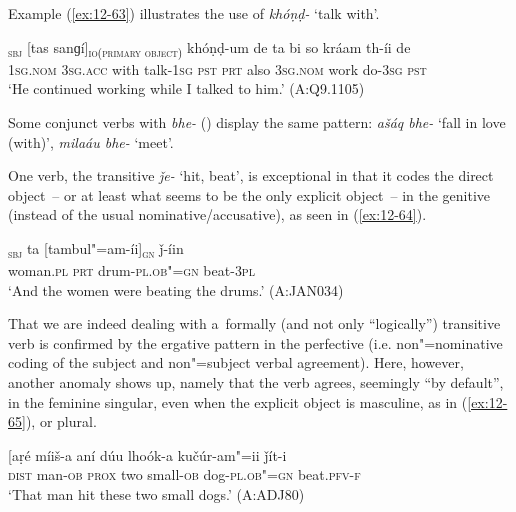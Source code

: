 Example (\ref{ex:12-63}) illustrates the use of \textit{khóṇḍ-} `talk with'.

\begin{exe}
\ex
\label{ex:12-63}
\gll [ma]\textsubscript{\textsc{sbj}} [tas sanɡí]\textsubscript{\textsc{io(primary object)}} khóṇḍ-um de ta bi so kráam th-íi de \\
\textsc{1sg.nom} \textsc{3sg.acc} with talk-\textsc{1sg} \textsc{pst}  \textsc{prt} also \textsc{3sg.nom} work do-\textsc{3sg} \textsc{pst} \\
\glt `He continued working while I talked to him.' (A:Q9.1105)
\end{exe}

Some conjunct verbs with \textit{bhe-} () display the same pattern: \textit{ašáq bhe-} `fall in love (with)', \textit{milaáu bhe-} `meet'.


 One verb, the transitive \textit{ǰe-} `hit, beat', is exceptional in that it codes the direct object~-- or at least what seems to be the only explicit object~-- in the genitive (instead of the usual nominative/accusative), as seen in (\ref{ex:12-64}).

\begin{exe}
\ex
\label{ex:12-64}
\gll [kuṛíina]\textsubscript{\textsc{sbj}} ta [tambul"=am-íi]\textsubscript{\textsc{gn}} ǰ-íin  \\
woman.\textsc{pl} \textsc{prt} drum-\textsc{pl.ob"=gn} beat-\textsc{3pl}  \\
\glt `And the women were beating the drums.' (A:JAN034)
\end{exe}

That we are indeed dealing with a~formally (and not only ``logically'') transitive verb is confirmed by the ergative pattern in the perfective (i.e. non"=nominative coding of the subject and non"=subject verbal agreement). Here, however, another anomaly shows up, namely that the verb agrees, seemingly ``by default'', in the feminine singular, even when the explicit object is masculine, as in (\ref{ex:12-65}), or plural.

\begin{exe}
\ex
\label{ex:12-65}
\gll [aṛé míiš-a aní dúu lhoók-a kučúr-am"=ii ǰít-i \\
\textsc{dist} man-\textsc{ob} \textsc{prox} two small-\textsc{ob} dog-\textsc{pl.ob"=gn} beat.\textsc{pfv-f} \\
\glt `That man hit these two small dogs.' (A:ADJ80)
\end{exe}

